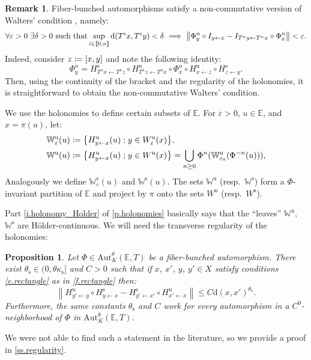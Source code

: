 \documentclass[JEP,XML,SOM,Unicode]{cedram}
\newcommand{\ldbrack}{[\![}
\newcommand{\rdbrack}{]\!]}
\def\vcentcolon{\mathrel{\mathop\ordinarycolon}}
\providecommand\ordinarycolon{:}
\providecommand*\coloneqq{\vcentcolon\mathrel{\mkern-1.2mu}=}
\newcommand\implique{\mathchoice{\Longrightarrow}{\Rightarrow}{\Rightarrow}{\Rightarrow}}
\theoremstyle{plain}
\newtheorem{proposition}[theorem]{Proposition}
\theoremstyle{definition}
\newtheorem{remark}[theorem]{Remark}
\newcommand{\EE}{\mathbb{E}}
\newcommand{\WW}{\mathbb{W}}
\newcommand{\st}{\;\mathord{;}\;}
\newcommand{\dd}{\mathrm{d}}
\newcommand{\uu}{\mathrm{u}}
\renewcommand{\ss}{\mathrm{s}}
\newcommand{\Aut}{\mathrm{Aut}}
\let\epsilon\varepsilon
\begin{document}
\begin{remark}
Fiber-bunched automorphisms satisfy a non-commutative version of Walters' condition \cite{Bousch_Walters}, namely:
\[
\forall \epsilon>0 \ \exists \delta> 0 \ \text{such that} \sup_{i \in \ldbrack 0,n \rdbrack} \dd(T^i x, T^i y) < \delta \ \implique \ \big\| \Phi_y^n \circ I_{y \gets x} - I_{T^n y \gets T^n x} \circ \Phi_x^n \big\| < \epsilon.
\]
Indeed, consider $z \coloneqq [x,y]$ and note the following identity:
\[
\Phi_y^n = H^\ss_{T^n x \gets T^n z} \circ H^\uu_{T^n z \gets T^n x} \circ \Phi^n_x \circ H^\uu_{x \gets z} \circ H^\ss_{z \gets y}.
\]
Then, using the continuity of the bracket and the regularity of the holonomies, it is straightforward to obtain the non-commutative Walters' condition.
\end{remark}

We use the holonomies to define certain subsets of $\EE$.
For $\epsilon>0$, $u \in \EE$, and $x = \pi(u)$, let:
\begin{align*}
\WW^\uu_\epsilon(u)	&\coloneqq \big\{ H^\uu_{y \gets x}(u) \st y \in W^\uu_\epsilon(x) \big\}, \\
\WW^\uu(u)			&\coloneqq \big\{ H^\uu_{y \gets x}(u) \st y \in W^\uu(x) \big\}
= \bigcup_{n\ge 0} \Phi^n(\WW^\uu_{\epsilon_0}(\Phi^{-n}(u))),
\end{align*}
Analogously we define $\WW^\ss_\epsilon(u)$ and $\WW^\ss(u)$.
The sets $\WW^\uu$ (resp.\ $\WW^\ss$) form a $\Phi$-invariant partition of $\EE$ and project by $\pi$ onto the sets $W^\uu$ (resp.\ $W^\ss$).

Part \eqref{i.holonomy_Holder} of \cref{p.holonomies} basically says that the ``leaves'' $\WW^\uu$, $\WW^\ss$ are Hölder-continuous.
We will need the transverse regularity of the holonomies:

\begin{proposition}\label{p.regularity_above}
Let	$\Phi \in \Aut^\theta_K(\EE,T)$ be a fiber-bunched automorphism.
There exist $\theta_\ss \in (0,\theta \kappa_\ss]$ and $C>0$ such that
if $x$, $x'$, $y$, $y' \in X$ satisfy conditions \eqref{e.rectangle} as in \cref{f.rectangle}
then:
\[
\left\| H^\uu_{y' \gets y} \circ H^\ss_{y \gets x} - H^\ss_{y' \gets x'} \circ H^\uu_{x'\gets x} \right\|
\le C \dd(x,x')^{\theta_\ss}.
\]
Furthermore, the same constants $\theta_\ss$ and $C$ work for every automorphism in a $C^0$-neighborhood of $\Phi$ in $\Aut^\theta_K(\EE,T)$.
\end{proposition}

We were not able to find such a statement in the literature,
so we provide a proof in \cref{ss.regularity}.
\end{document}
